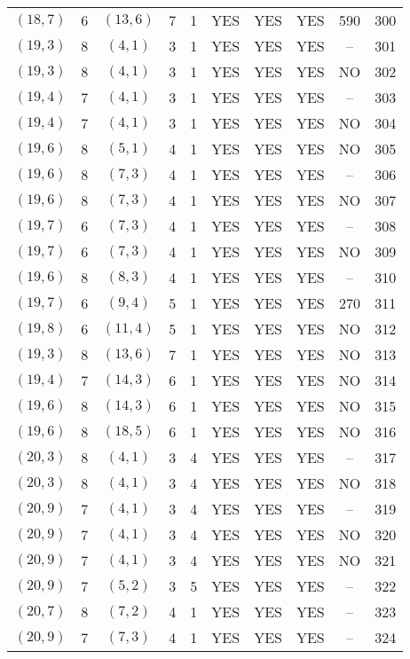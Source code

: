 \begin{longtable}{|c|c|c|c|c|c|c|c|c|c|}
$(18, 7)$ & 6 & $(13, 6)$ & 7 & 1 & YES & YES & YES & 590 & 300\\
$(19, 3)$ & 8 & $(4, 1)$ & 3 & 1 & YES & YES & YES & -- & 301\\
$(19, 3)$ & 8 & $(4, 1)$ & 3 & 1 & YES & YES & YES & NO & 302\\
$(19, 4)$ & 7 & $(4, 1)$ & 3 & 1 & YES & YES & YES & -- & 303\\
$(19, 4)$ & 7 & $(4, 1)$ & 3 & 1 & YES & YES & YES & NO & 304\\
$(19, 6)$ & 8 & $(5, 1)$ & 4 & 1 & YES & YES & YES & NO & 305\\
$(19, 6)$ & 8 & $(7, 3)$ & 4 & 1 & YES & YES & YES & -- & 306\\
$(19, 6)$ & 8 & $(7, 3)$ & 4 & 1 & YES & YES & YES & NO & 307\\
$(19, 7)$ & 6 & $(7, 3)$ & 4 & 1 & YES & YES & YES & -- & 308\\
$(19, 7)$ & 6 & $(7, 3)$ & 4 & 1 & YES & YES & YES & NO & 309\\
$(19, 6)$ & 8 & $(8, 3)$ & 4 & 1 & YES & YES & YES & -- & 310\\
$(19, 7)$ & 6 & $(9, 4)$ & 5 & 1 & YES & YES & YES & 270 & 311\\
$(19, 8)$ & 6 & $(11, 4)$ & 5 & 1 & YES & YES & YES & NO & 312\\
$(19, 3)$ & 8 & $(13, 6)$ & 7 & 1 & YES & YES & YES & NO & 313\\
$(19, 4)$ & 7 & $(14, 3)$ & 6 & 1 & YES & YES & YES & NO & 314\\
$(19, 6)$ & 8 & $(14, 3)$ & 6 & 1 & YES & YES & YES & NO & 315\\
$(19, 6)$ & 8 & $(18, 5)$ & 6 & 1 & YES & YES & YES & NO & 316\\
$(20, 3)$ & 8 & $(4, 1)$ & 3 & 4 & YES & YES & YES & -- & 317\\
$(20, 3)$ & 8 & $(4, 1)$ & 3 & 4 & YES & YES & YES & NO & 318\\
$(20, 9)$ & 7 & $(4, 1)$ & 3 & 4 & YES & YES & YES & -- & 319\\
$(20, 9)$ & 7 & $(4, 1)$ & 3 & 4 & YES & YES & YES & NO & 320\\
$(20, 9)$ & 7 & $(4, 1)$ & 3 & 4 & YES & YES & YES & NO & 321\\
$(20, 9)$ & 7 & $(5, 2)$ & 3 & 5 & YES & YES & YES & -- & 322\\
$(20, 7)$ & 8 & $(7, 2)$ & 4 & 1 & YES & YES & YES & -- & 323\\
$(20, 9)$ & 7 & $(7, 3)$ & 4 & 1 & YES & YES & YES & -- & 324\\

\end{longtable}
